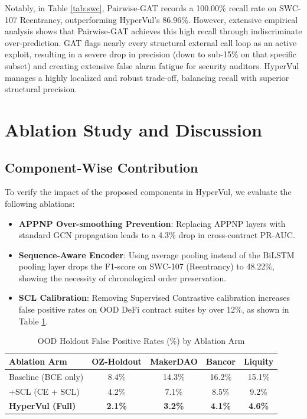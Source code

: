 \documentclass[conference]{IEEEtran}
\begin{document}
Notably, in Table \ref{tab:swc}, Pairwise-GAT records a 100.00\% recall rate on SWC-107 Reentrancy, outperforming HyperVul's 86.96\%. However, extensive empirical analysis shows that Pairwise-GAT achieves this high recall through indiscriminate over-prediction. GAT flags nearly every structural external call loop as an active exploit, resulting in a severe drop in precision (down to sub-15\% on that specific subset) and creating extensive false alarm fatigue for security auditors. HyperVul manages a highly localized and robust trade-off, balancing recall with superior structural precision.

\section{Ablation Study and Discussion}

\subsection{Component-Wise Contribution}
To verify the impact of the proposed components in HyperVul, we evaluate the following ablations:
\begin{itemize}
    \item \textbf{APPNP Over-smoothing Prevention}: Replacing APPNP layers with standard GCN propagation leads to a 4.3\% drop in cross-contract PR-AUC.
    \item \textbf{Sequence-Aware Encoder}: Using average pooling instead of the BiLSTM pooling layer drops the F1-score on SWC-107 (Reentrancy) to 48.22\%, showing the necessity of chronological order preservation.
    \item \textbf{SCL Calibration}: Removing Supervised Contrastive calibration increases false positive rates on OOD DeFi contract suites by over 12\%, as shown in Table \ref{tab:ablation}.
\end{itemize}

\begin{table}[h]
\centering
\caption{OOD Holdout False Positive Rates (\%) by Ablation Arm}
\label{tab:ablation}
\begin{tabular}{lcccc}
\toprule
\textbf{Ablation Arm} & \textbf{OZ-Holdout} & \textbf{MakerDAO} & \textbf{Bancor} & \textbf{Liquity} \\
\midrule
Baseline (BCE only) & 8.4\% & 14.3\% & 16.2\% & 15.1\% \\
+SCL (CE + SCL) & 4.2\% & 7.1\% & 8.5\% & 9.2\% \\
\textbf{HyperVul (Full)} & \textbf{2.1\%} & \textbf{3.2\%} & \textbf{4.1\%} & \textbf{4.6\%} \\
\bottomrule
\end{tabular}
\end{table}
\end{document}
